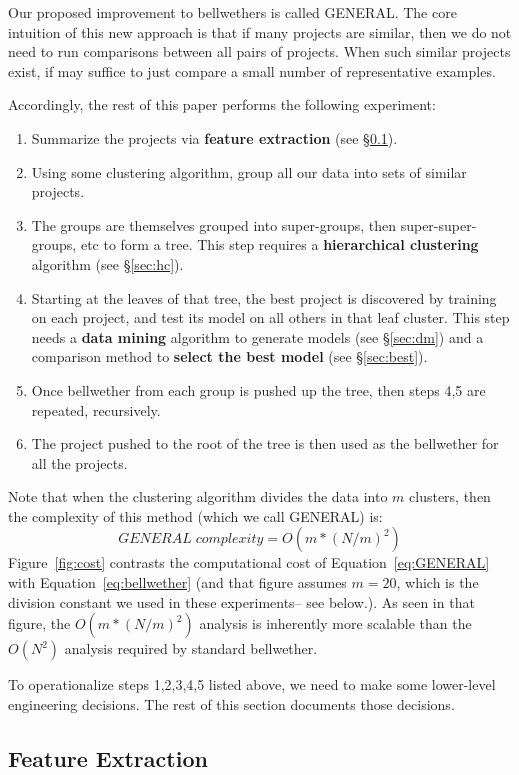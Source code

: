 \documentclass[10pt,journal,compsoc]{IEEEtran}
\newcommand{\fig}[1]{Figure~\ref{fig:#1}}
\newcommand{\be}{\begin{enumerate}}
\newcommand{\ee}{\end{enumerate}}
\begin{document}
 
 Our proposed improvement to bellwethers is called GENERAL. The core intuition of this new approach is that if many projects are similar, then we do not need to run comparisons between all pairs of projects. When such similar projects exist, if may suffice to just compare a small number of   representative examples. 
 
 Accordingly, the rest of this paper performs the following experiment:
 \be
 \item Summarize the projects via {\bf feature extraction} (see \S\ref{sec:fx}).
 \item Using some clustering algorithm, group all our data into sets of similar projects.
 \item The groups are themselves grouped into super-groups, then super-super-groups, etc to form a tree.  This step requires a {\bf hierarchical clustering} algorithm (see \S\ref{sec:hc}).
 \item Starting at the leaves of that tree,   the best project is discovered by training on each project, and test its model
 on all others in that leaf cluster.
 This step needs
  a {\bf data mining} algorithm to generate models (see \S\ref{sec:dm})
 and  a comparison method to {\bf select the best model} (see \S\ref{sec:best}).
 \item  Once bellwether from each group is  pushed up the tree, then steps 4,5 are repeated,
 recursively.
 \item The project pushed to the root of the tree is then used as  the bellwether for all the projects.
 \ee
 Note that when the clustering algorithm divides the data into $m$ clusters, then the complexity of this method (which we call GENERAL) is: 
 \begin{equation}
\label{eq:GENERAL}
    {GENERAL\; complexity } =  O(m*(N/m)^2)
\end{equation}
 \fig{cost} contrasts the computational cost of Equation~\ref{eq:GENERAL} with Equation~\ref{eq:bellwether}   
 (and that figure assumes $m=20$, which is the division constant we used in these experiments-- see below.).
 As seen in that figure,  the $O(m*(N/m)^2)$ analysis is inherently   more scalable than the $O(N^2)$ analysis  required by standard bellwether.
 
To operationalize steps 1,2,3,4,5 listed above, we need to make some lower-level engineering decisions. The rest of this section documents those decisions.

\subsection{Feature Extraction}\label{sec:fx}
\end{document}
